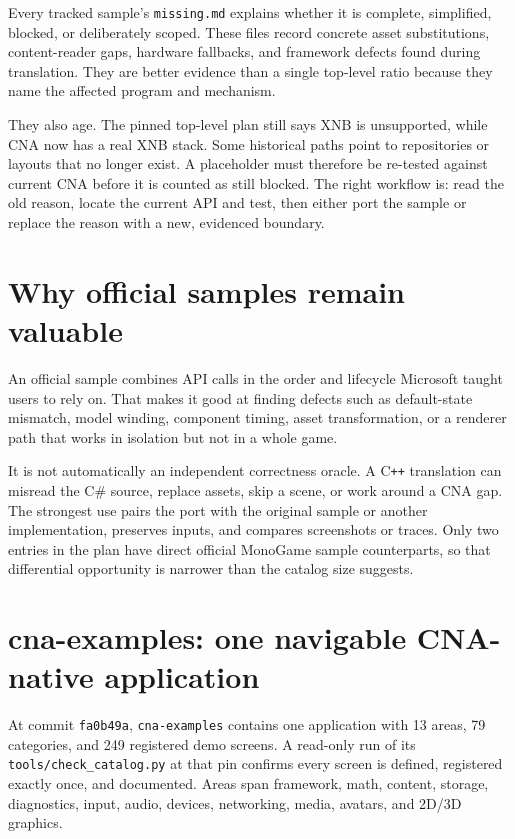 Every tracked sample's \texttt{missing.md} explains whether it is complete, simplified, blocked,
or deliberately scoped.  These files record concrete asset substitutions, content-reader gaps,
hardware fallbacks, and framework defects found during translation.  They are better evidence
than a single top-level ratio because they name the affected program and mechanism.

They also age.  The pinned top-level plan still says XNB is unsupported, while CNA now has a real
XNB stack.  Some historical paths point to repositories or layouts that no longer exist.  A
placeholder must therefore be re-tested against current CNA before it is counted as still blocked.
The right workflow is: read the old reason, locate the current API and test, then either port the
sample or replace the reason with a new, evidenced boundary.

\section{Why official samples remain valuable}

An official sample combines API calls in the order and lifecycle Microsoft taught users to rely
on.  That makes it good at finding defects such as default-state mismatch, model winding,
component timing, asset transformation, or a renderer path that works in isolation but not in a
whole game.

It is not automatically an independent correctness oracle.  A C\texttt{++} translation can
misread the C\# source, replace assets, skip a scene, or work around a CNA gap.  The strongest use
pairs the port with the original sample or another implementation, preserves inputs, and compares
screenshots or traces.  Only two entries in the plan have direct official MonoGame sample
counterparts, so that differential opportunity is narrower than the catalog size suggests.

\section{cna-examples: one navigable CNA-native application}

At commit \texttt{fa0b49a}, \texttt{cna-examples} contains one application with 13 areas, 79
categories, and 249 registered demo screens.  A read-only run of its
\texttt{tools/check\_catalog.py} at that pin confirms every screen is defined, registered exactly
once, and documented.  Areas span framework, math, content, storage, diagnostics, input, audio,
devices, networking, media, avatars, and 2D/3D graphics.

